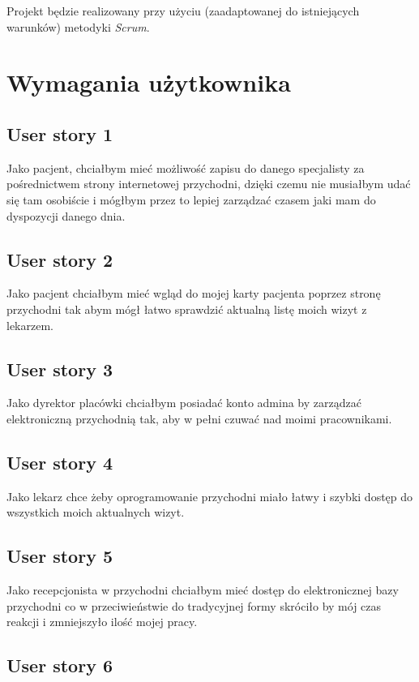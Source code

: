 \documentclass[a4paper]{article} \usepackage{polski} \usepackage[cp1250]{inputenc} \usepackage{url}
\begin{document}
Projekt będzie realizowany przy użyciu (zaadaptowanej do istniejących warunków) metodyki {\em Scrum}.

\section{Wymagania użytkownika}


\subsection{User story 1}


Jako pacjent, chciałbym mieć możliwość zapisu do danego specjalisty za pośrednictwem strony internetowej przychodni, dzięki czemu nie musiałbym udać się tam osobiście i mógłbym przez to lepiej zarządzać czasem jaki mam do dyspozycji danego dnia.

\subsection{User story 2}

Jako pacjent chciałbym mieć wgląd do mojej karty pacjenta poprzez stronę przychodni tak abym mógł łatwo sprawdzić aktualną listę moich wizyt z lekarzem.

\subsection{User story 3}


Jako dyrektor placówki chciałbym posiadać konto admina by zarządzać elektroniczną przychodnią tak, aby w pełni czuwać nad moimi pracownikami.

\subsection{User story 4}


Jako lekarz chce żeby oprogramowanie przychodni miało łatwy i szybki dostęp do wszystkich moich aktualnych wizyt.


\subsection{User story 5}


Jako recepcjonista w przychodni chciałbym mieć dostęp do elektronicznej bazy przychodni co w przeciwieństwie do tradycyjnej formy skróciło by mój czas reakcji i zmniejszyło ilość mojej pracy.

\subsection{User story 6}
\end{document}
